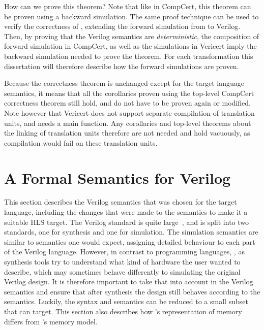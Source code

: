 How can we prove this theorem?  Note that like in CompCert, this theorem can be
proven using a backward simulation.  The same proof technique can be used to
verify the correctness of \vericert{}, extending the forward simulation from
\rtl{} to Verilog.  Then, by proving that the Verilog semantics are
\emph{deterministic}, the composition of forward simulation in CompCert, as well
as the simulations in Vericert imply the backward simulation needed to prove the
theorem.  For each transformation this dissertation will therefore describe how
the forward simulations are proven.

Because the correctness theorem is unchanged except for the target language
semantics, it means that all the corollaries proven using the top-level CompCert
correctness theorem still hold, and do not have to be proven again or modified.
Note however that Vericert does not support separate compilation of translation
units, and needs a main function.  Any corollaries and top-level theorems about
the linking of translation units therefore are not needed and hold vacuously, as
compilation would fail on these translation units.

\section{A Formal Semantics for Verilog}\label{sec:verilog}

This section describes the Verilog semantics that was chosen for the target
language, including the changes that were made to the semantics to make it a
suitable HLS target.  The Verilog standard is quite
large~\cite{06_ieee_stand_veril_hardw_descr_languag,
  05_ieee_stand_veril_regis_trans_level_synth}, and is split into two standards,
one for synthesis and one for simulation.  The simulation semantics are similar
to semantics one would expect, assigning detailed behaviour to each part of the
Verilog language.  However, in contrast to programming languages,
, as synthesis tools try to
understand what kind of hardware the user wanted to describe, which may
sometimes behave differently to simulating the original Verilog design.  It is
therefore important to take that into account in the Verilog semantics and
ensure that after synthesis the design still behaves according to the semantics.
Luckily, the syntax and semantics can be reduced to a small subset that
\vericert{} can target.  This section also describes how \vericert{}'s
representation of memory differs from \compcert{}'s memory model.

